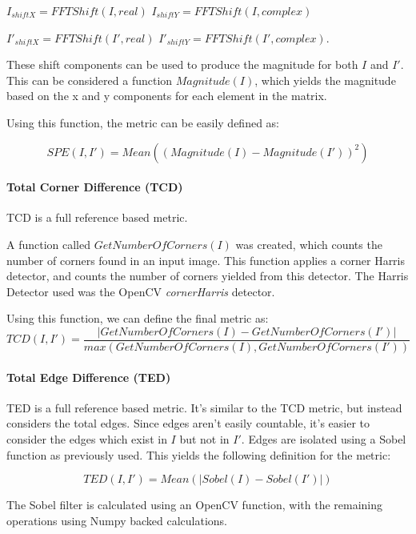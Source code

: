 \documentclass[12pt,a4paper]{article}
\begin{document}
                $I_{shiftX} = FFTShift(I, real)$
                $I_{shiftY} = FFTShift(I, complex)$

                $I'_{shiftX} = FFTShift(I', real)$
                $I'_{shiftY} = FFTShift(I', complex)$.

                These shift components can be used to produce the magnitude for both $I$ and $I'$. This can be considered a function $Magnitude(I)$, which yields the magnitude based on the
                x and y components for each element in the matrix.

                Using this function, the metric can be easily defined as:

                $$SPE(I, I') = Mean((Magnitude(I) - Magnitude(I'))^2)$$


            \paragraph{Total Corner Difference (TCD)}
                TCD is a full reference based metric. 
                
                A function called $GetNumberOfCorners(I)$ was created, which counts the number of corners found in an input image. This function applies a corner Harris detector,
                and counts the number of corners yielded from this detector. The Harris Detector used was the OpenCV \emph{cornerHarris} detector. 

                Using this function, we can define the final metric as: 
                $$TCD(I, I') = \frac{|GetNumberOfCorners(I) - GetNumberOfCorners(I')|}{max({GetNumberOfCorners(I), GetNumberOfCorners(I')})}$$

            \paragraph{Total Edge Difference (TED)}
                TED is a full reference based metric. It's similar to the TCD metric, but instead considers the total edges.
                Since edges aren't easily countable, it's easier to consider the edges which exist in $I$ but not in $I'$. 
                Edges are isolated using a Sobel function as previously used. This yields the following definition for the metric:

                $$TED(I, I') = Mean(|Sobel(I) - Sobel(I')|)$$

                The Sobel filter is calculated using an OpenCV function, with the remaining operations using Numpy backed calculations.
\end{document}
